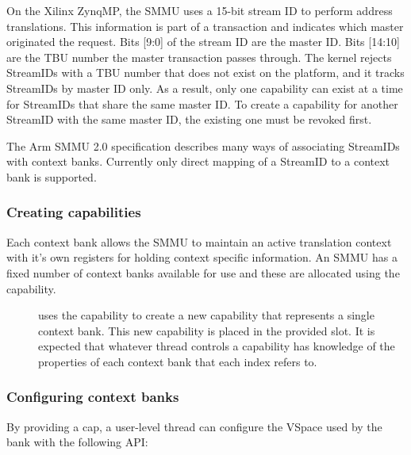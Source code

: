 On the Xilinx ZynqMP, the SMMU uses a 15-bit stream ID to perform address
translations. This information is part of a transaction and indicates which
master originated the request. Bits [9:0] of the stream ID are the master ID.
Bits [14:10] are the TBU number the master transaction passes through. The
kernel rejects StreamIDs with a TBU number that does not exist on the platform,
and it tracks StreamIDs by master ID only. As a result, only one
 capability can exist at a time for StreamIDs that share
the same master ID. To create a capability for another StreamID with the same
master ID, the existing one must be revoked first.

The Arm SMMU 2.0 specification describes many ways of associating StreamIDs with
context banks. Currently only direct mapping of a StreamID to a context bank is
supported.

\subsubsection{Creating  capabilities}
\label{sec:smmuv2-creating-sel4-arm-cb-capabilities}

Each context bank allows the SMMU to maintain an active translation context with
it's own registers for holding context specific information. An SMMU has a fixed
number of context banks available for use and these are allocated using the
 capability.

\begin{description}

\item[] uses the
     capability to create a new 
    capability that represents a single context bank.  This new capability is
    placed in the provided slot.  It is expected that whatever thread controls a
     capability has knowledge of the properties of each
    context bank that each index refers to.
\end{description}


\subsubsection{Configuring context banks}
\label{sec:smmuv2-configuring-context-banks}

By providing a  cap, a user-level thread can configure the
VSpace used by the bank with the following API:

